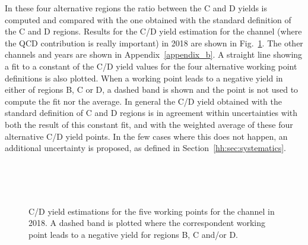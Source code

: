 \documentclass[../main.tex]{subfiles}
\begin{document}
In these four alternative regions the ratio between the C and D yields is computed and compared with the one obtained with the standard definition of the C and D regions. Results for the C/D yield estimation for the \tauh\tauh{} channel (where the QCD contribution is really important) in 2018 are shown in Fig.~\ref{hh:fig:qcd_test1}. The other channels and years are shown in Appendix~\ref{appendix_b}. A straight line showing a fit to a constant of the C/D yield values for the four alternative working point definitions is also plotted. When a working point leads to a negative yield in either of regions B, C or D, a dashed band is shown and the point is not used to compute the fit nor the average. In general the C/D yield obtained with the standard definition of C and D regions is in agreement within uncertainties with both the result of this constant fit, and with the weighted average of these four alternative C/D yield points. In the few cases where this does not happen, an additional uncertainty is proposed, as defined in Section~\ref{hh:sec:systematics}.

\begin{figure}[h!]
\begin{center}
\\
\\
\\
\end{center}
\caption[QCD estimation - First validity test]{C/D yield estimations for the five working points for the \tauh\tauh{} channel in 2018. A dashed band is plotted where the correspondent working point leads to a negative yield for regions B, C and/or D.}
\label{hh:fig:qcd_test1}
\end{figure}
\end{document}
